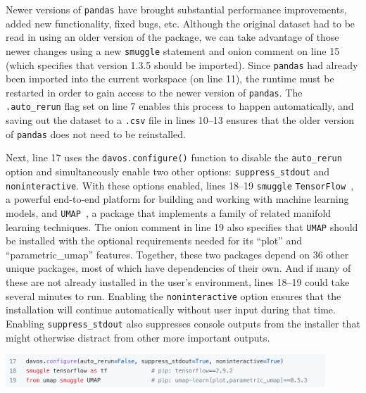 \documentclass[preprint,12pt,a4paper]{elsarticle}
\begin{document}
Newer versions of \texttt{pandas} have brought substantial
performance improvements, added new functionality, fixed bugs, etc.
Although the original dataset had to be read in using an older version
of the package, we can take advantage of those newer changes using a
new \texttt{smuggle} statement and onion comment on line 15 (which
specifies that version 1.3.5 should be imported).  Since
\texttt{pandas} had already been imported into the current workspace
(on line 11), the runtime must be restarted in order to gain access to
the newer version of \texttt{pandas}.  The \texttt{.auto\_rerun} flag
set on line 7 enables this process to happen automatically, and saving
out the dataset to a \texttt{.csv} file in lines 10--13 ensures that
the older version of \texttt{pandas} does not need to be reinstalled.

Next, line 17 uses the \texttt{davos.configure()} function to disable
the \texttt{auto\_rerun} option and simultaneously enable two other
options: \texttt{suppress\_stdout} and \texttt{noninteractive}. With
these options enabled, lines 18--19 \texttt{smuggle}
\texttt{TensorFlow}~\cite{AbadEtal15}, a powerful end-to-end platform
for building and working with machine learning models, and
\texttt{UMAP}~\cite{McInEtal18b}, a package that implements a family
of related manifold learning techniques. The onion comment in line 19
also specifies that \texttt{UMAP} should be installed with the
optional requirements needed for its ``plot'' and ``parametric\_umap''
features. Together, these two packages depend on 36 other unique
packages, most of which have dependencies of their own. And if many of
these are not already installed in the user's environment, lines
18--19 could take several minutes to run.  Enabling the
\texttt{noninteractive} option ensures that the installation will
continue automatically without user input during that time.  Enabling
\texttt{suppress\_stdout} also suppresses console outputs from the
installer that might otherwise distract from other more important outputs.
\begin{center}
\includegraphics[width=0.9\textwidth]{figs/example4}
\end{center}
\end{document}
